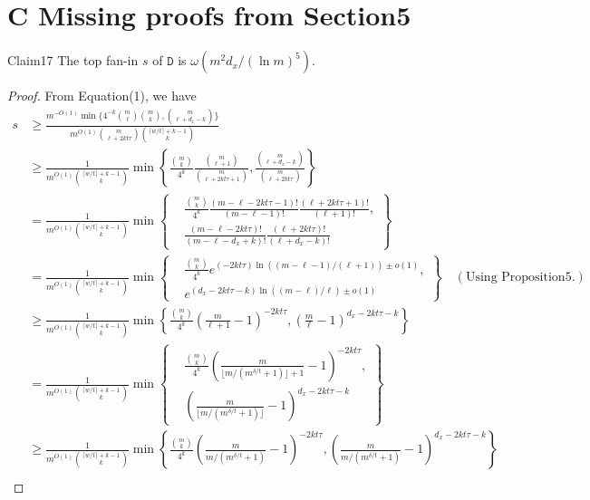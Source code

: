 \section*{C Missing proofs from Section5}
\begin{authorclaim}{Claim17}
The top fan-in $s$ of $\mathtt D$ is $\omega(m^2d_x/(\ln m)^5)$.
\end{authorclaim}
\begin{proof}
From Equation(1), we have
\begin{align*}
s&\ge\frac{m^{-O(1)}\min\{4^{-k}\binom m\ell\binom mk,\binom m{\ell+d_x-k}\}}
{m^{O(1)}\binom m{\ell+2kt\tau}\binom{\lceil w/t\rceil+k-1}k}\\
&\ge\frac1{m^{O(1)}\binom{\lceil w/t\rceil+k-1}k}
\min\left\{\frac{\binom mk}{4^k}\frac{\binom m{\ell+1}}{\binom m{\ell+2kt\tau+1}},
\frac{\binom m{\ell+d_x-k}}{\binom m{\ell+2kt\tau}}\right\}\\
&=\frac1{m^{O(1)}\binom{\lceil w/t\rceil+k-1}k}
\min\left\{\begin{aligned}
&\frac{\binom mk}{4^k}\frac{(m-\ell-2kt\tau-1)!}{(m-\ell-1)!}
\frac{(\ell+2kt\tau+1)!}{(\ell+1)!},\\
&\frac{(m-\ell-2kt\tau)!}{(m-\ell-d_x+k)!}
\frac{(\ell+2kt\tau)!}{(\ell+d_x-k)!}
\end{aligned}\right\}\\
&=\frac1{m^{O(1)}\binom{\lceil w/t\rceil+k-1}k}
\min\left\{\begin{aligned}
&\frac{\binom mk}{4^k}
e^{(-2kt\tau)\ln((m-\ell-1)/(\ell+1))\pm o(1)},\\
&e^{(d_x-2kt\tau-k)\ln((m-\ell)/\ell)\pm o(1)}
\end{aligned}\right\}\quad(\text{Using Proposition5.})\\
&\ge\frac1{m^{O(1)}\binom{\lceil w/t\rceil+k-1}k}
\min\left\{\frac{\binom mk}{4^k}\left(\frac m{\ell+1}-1\right)^{-2kt\tau},
\left(\frac m\ell-1\right)^{d_x-2kt\tau-k}\right\}\\
&=\frac1{m^{O(1)}\binom{\lceil w/t\rceil+k-1}k}
\min\left\{\begin{aligned}
&\frac{\binom mk}{4^k}
\left(\frac m{\lfloor m/(m^{\delta/t}+1)\rfloor+1}-1\right)^{-2kt\tau},\\
&\left(\frac m{\lfloor m/(m^{\delta/t}+1)\rfloor}-1\right)^{d_x-2kt\tau-k}
\end{aligned}\right\}\\
&\ge\frac1{m^{O(1)}\binom{\lceil w/t\rceil+k-1}k}
\min\left\{\frac{\binom mk}{4^k}\left(\frac m{m/(m^{\delta/t}+1)}-1\right)^{-2kt\tau},
\left(\frac m{m/(m^{\delta/t}+1)}-1\right)^{d_x-2kt\tau-k}\right\}\\

\end{align*}
\end{proof}

